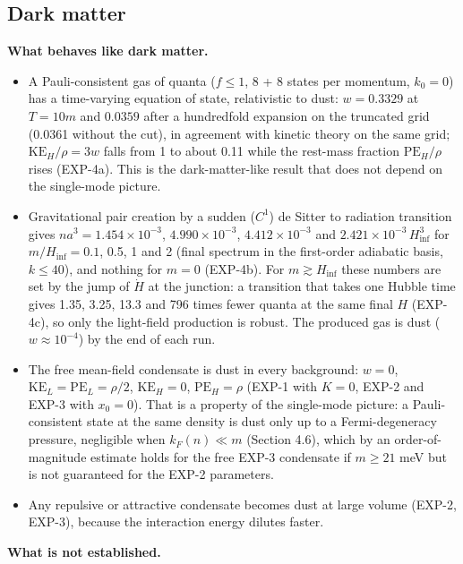 \documentclass[11pt]{article}
\begin{document}
\subsection{Dark matter}

\textbf{What behaves like dark matter.}

\begin{itemize}
\item A Pauli-consistent gas of quanta ($f\le1$, 8 + 8 states per momentum, $k_0=0$) has a time-varying equation of state, relativistic to dust: $w=0.3329$ at $T=10m$ and $0.0359$ after a hundredfold expansion on the truncated grid (0.0361 without the cut), in agreement with kinetic theory on the same grid; $\mathrm{KE}_H/\rho=3w$ falls from 1 to about 0.11 while the rest-mass fraction $\mathrm{PE}_H/\rho$ rises (EXP-4a). This is the dark-matter-like result that does not depend on the single-mode picture.
\item Gravitational pair creation by a sudden ($C^1$) de Sitter to radiation transition gives $na^3=1.454\times10^{-3}$, $4.990\times10^{-3}$, $4.412\times10^{-3}$ and $2.421\times10^{-3}\,H_{\mathrm{inf}}^3$ for $m/H_{\mathrm{inf}}=0.1$, 0.5, 1 and 2 (final spectrum in the first-order adiabatic basis, $k\le40$), and nothing for $m=0$ (EXP-4b). For $m\gtrsim H_{\mathrm{inf}}$ these numbers are set by the jump of $\dot H$ at the junction: a transition that takes one Hubble time gives 1.35, 3.25, 13.3 and 796 times fewer quanta at the same final $H$ (EXP-4c), so only the light-field production is robust. The produced gas is dust ($w\approx10^{-4}$) by the end of each run.
\item The free mean-field condensate is dust in every background: $w=0$, $\mathrm{KE}_L=\mathrm{PE}_L=\rho/2$, $\mathrm{KE}_H=0$, $\mathrm{PE}_H=\rho$ (EXP-1 with $K=0$, EXP-2 and EXP-3 with $x_0=0$). That is a property of the single-mode picture: a Pauli-consistent state at the same density is dust only up to a Fermi-degeneracy pressure, negligible when $k_F(n)\ll m$ (Section 4.6), which by an order-of-magnitude estimate holds for the free EXP-3 condensate if $m\ge21$ meV but is not guaranteed for the EXP-2 parameters.
\item Any repulsive or attractive condensate becomes dust at large volume (EXP-2, EXP-3), because the interaction energy dilutes faster.
\end{itemize}

\textbf{What is not established.}
\end{document}
